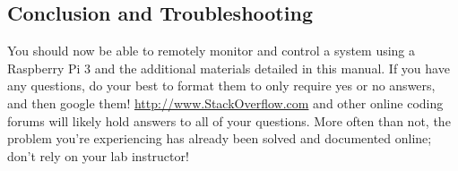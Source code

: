 \documentclass{article}
\begin{document}
\subsection{Conclusion and Troubleshooting}
  You should now be able to remotely monitor and control a system using a Raspberry Pi 3 and the additional materials detailed in this manual. If you have any questions, do your best to format them to only require yes or no answers, and then google them! \url{http://www.StackOverflow.com} and other online coding forums will likely hold answers to all of your questions. More often than not, the problem you're experiencing has already been solved and documented online; don't rely on your lab instructor!
\end{document}
